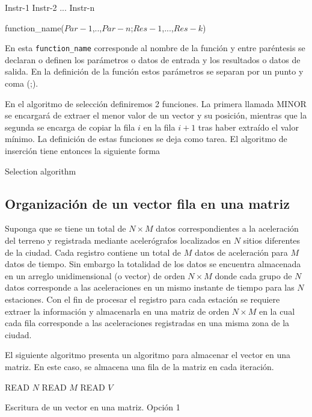 \begin{algorithm}[H]
 \SetAlgoLined
 Instr-1\;
 Instr-2\;
 ...\;
 Instr-n\;
\caption{function\_name($Par-1$,..,$Par-n$;$Res-1$,...,$Res-k$)}
\label{seqstru}
\end{algorithm}

En esta \texttt{function\_name} corresponde al nombre de la función y entre paréntesis se declaran o definen los parámetros o datos de entrada y los resultados o datos de salida. En la definición de la función estos parámetros se separan por un punto y coma (;).

En el algoritmo de selección definiremos 2 funciones. La primera llamada MINOR se encargará de extraer el menor valor de un vector y su posición, mientras que la segunda se encarga de copiar la fila $i$ en la fila $i+1$ tras haber extraído el valor mínimo. La definición de estas funciones se deja como tarea. El algoritmo de inserción tiene entonces la siguiente forma

\begin{algorithm}[H]
\SetAlgoLined
{}
\caption{Selection algorithm}
\label{algo:selection}
\end{algorithm}


\subsection{Organización de un vector fila en una matriz}
Suponga que se tiene un total de $N \times M$ datos correspondientes a la aceleración del terreno y registrada mediante acelerógrafos localizados en $N$ sitios diferentes de la ciudad. Cada registro contiene un total de $M$ datos de aceleración para $M$ datos de tiempo. Sin embargo la totalidad de los datos se encuentra almacenada en un arreglo unidimensional (o vector) de orden $N \times M$ donde cada grupo de $N$ datos corresponde a las aceleraciones en un mismo instante de tiempo para las $N$ estaciones. Con el fin de procesar el registro para cada estación se requiere extraer la información y almacenarla en una matriz de orden $N \times M$  en la cual cada fila corresponde a las aceleraciones registradas en una misma zona de la ciudad.

El siguiente algoritmo presenta un algoritmo para almacenar el vector en una matriz. En este caso, se almacena una fila de la matriz en cada iteración.\\
\begin{algorithm}[H]
\SetAlgoLined
{}
READ $N$\;
READ $M$\;
READ $V$\;
\caption{Escritura de un vector en una matriz. Opción 1}
\label{matrix}
\end{algorithm}



